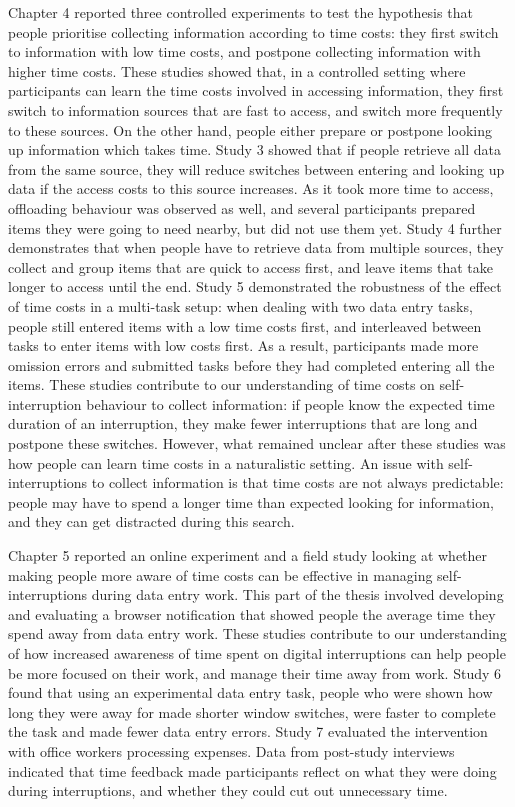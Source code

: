 Chapter 4 reported three controlled experiments to test the hypothesis that people prioritise collecting information according to time costs: they first switch to information with low time costs, and postpone collecting information with higher time costs. These studies showed that, in a controlled setting where participants can learn the time costs involved in accessing information, they first switch to information sources that are fast to access, and switch more frequently to these sources. On the other hand, people either prepare or postpone looking up information which takes time. Study 3 showed that if people retrieve all data from the same source, they will reduce switches between entering and looking up data if the access costs to this source increases. As it took more time to access, offloading behaviour was observed as well, and several participants prepared items they were going to need nearby, but did not use them yet. Study 4 further demonstrates that when people have to retrieve data from multiple sources, they collect and group items that are quick to access first, and leave items that take longer to access until the end. Study 5 demonstrated the robustness of the effect of time costs in a multi-task setup: when dealing with two data entry tasks, people still entered items with a low time costs first, and interleaved between tasks to enter items with low costs first. As a result, participants made more omission errors and submitted tasks before they had completed entering all the items. These studies contribute to our understanding of time costs on self-interruption behaviour to collect information: if people know the expected time duration of an interruption, they make fewer interruptions that are long and postpone these switches. However, what remained unclear after these studies was how people can learn time costs in a naturalistic setting. An issue with self-interruptions to collect information is that time costs are not always predictable: people may have to spend a longer time than expected looking for information, and they can get distracted during this search. 

Chapter 5 reported an online experiment and a field study looking at whether making people more aware of time costs can be effective in managing self-interruptions during data entry work. This part of the thesis involved developing and evaluating  a browser notification that showed people the average time they spend away from data entry work. These studies contribute to our understanding of how increased awareness of time spent on digital interruptions can help people be more focused on their work, and manage their time away from work. Study 6 found that using an experimental data entry task, people who were shown how long they were away for made shorter window switches, were faster to complete the task and made fewer data entry errors. Study 7 evaluated the intervention with office workers processing expenses. Data from post-study interviews indicated that time feedback made participants reflect on what they were doing during interruptions, and whether they could cut out unnecessary time. 

